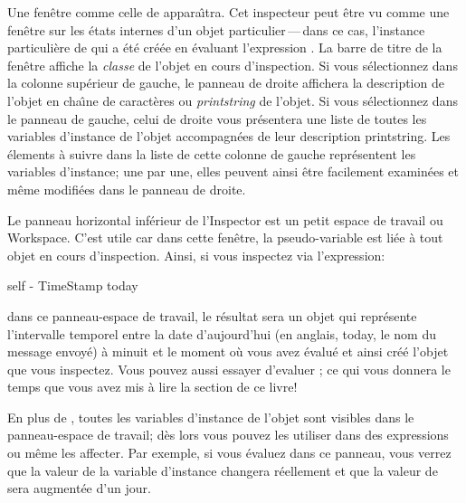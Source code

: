 \documentclass[a4paper,10pt,twoside]{book}
\begin{document}
Une fen\^etre comme celle de  appara\^{\i}tra.
Cet inspecteur peut \^etre vu comme une fen\^etre sur les \'etats internes
d'un objet particulier\,---\,dans ce cas, l'instance particuli\`ere
de
 \mbox{} 
qui a \'et\'e cr\'e\'ee en \'evaluant l'expression 
.
La barre de titre de la fen\^etre affiche la \emph{classe} de l'objet
en cours d'inspection.
Si vous s\'electionnez  dans la colonne sup\'erieur de gauche,
le panneau de droite affichera la description de l'objet en cha\^{\i}ne de caract\`eres ou \emph{printstring} de l'objet.
Si vous s\'electionnez  dans le panneau de gauche,
celui de droite vous pr\'esentera une liste de 
toutes les variables d'instance de l'objet accompagn\'ees de leur
description printstring.
Les \'elements \`a suivre dans la liste de cette colonne de gauche
repr\'esentent les variables d'instance; une par une, elles peuvent ainsi
\^etre facilement examin\'ees et m\^eme modifi\'ees dans le panneau de droite.


Le panneau horizontal inf\'erieur de l'Inspector est un petit espace de
travail ou Workspace.
C'est utile car dans cette fen\^etre, la pseudo-variable  est
li\'ee
\`a tout objet en cours d'inspection.
Ainsi, si vous inspectez via  l'expression:
\begin{code}{}
self - TimeStamp today
\end{code}
dans ce panneau-espace de travail, le r\'esultat sera un objet 
 qui repr\'esente l'intervalle temporel entre 
la date d'aujourd'hui (en anglais, today, le nom du message envoy\'e) \`a
minuit et le moment o\`u vous avez \'evalu\'e 
et ainsi cr\'e\'e l'objet  que vous inspectez.
Vous pouvez aussi essayer d'evaluer ; 
ce qui vous donnera le temps que vous avez mis \`a lire la section de ce livre!

En plus de , toutes les variables d'instance de l'objet sont
visibles dans le panneau-espace de travail; d\`es lors vous pouvez
les utiliser dans des expressions ou m\^eme les affecter.
Par exemple, si vous \'evaluez  dans ce panneau,
vous verrez que la valeur de la variable d'instance  
changera r\'eellement et que la valeur de  
sera augment\'ee d'un jour.
\end{document}
